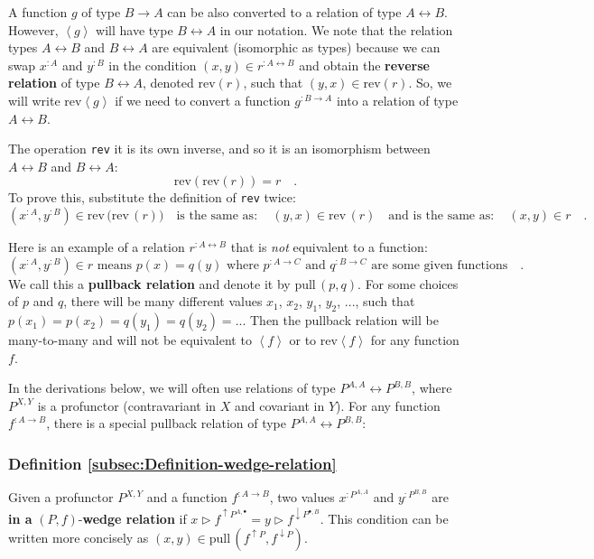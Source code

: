A function $g$ of type $B\rightarrow A$ can be also converted to
a relation of type $A\leftrightarrow B$. However, $\left<g\right>$
will have type $B\leftrightarrow A$ in our notation. We note that
the relation types $A\leftrightarrow B$ and $B\leftrightarrow A$
are equivalent (isomorphic as types) because we can swap $x^{:A}$
and $y^{:B}$ in the condition $(x,y)\in r^{:A\leftrightarrow B}$
and obtain the \textbf{reverse relation}
of type $B\leftrightarrow A$, denoted $\text{rev}\left(r\right)$,
such that $(y,x)\in\text{rev}\left(r\right)$. So, we will write $\text{rev}\left<g\right>$
if we need to convert a function $g^{:B\rightarrow A}$ into a relation
of type $A\leftrightarrow B$.

The operation \lstinline!rev! it is its own inverse, and so it is
an isomorphism between $A\leftrightarrow B$ and $B\leftrightarrow A$:
\[
\text{rev}\left(\text{rev}\left(r\right)\right)=r\quad.
\]
To prove this, substitute the definition of \lstinline!rev! twice:
\[
(x^{:A},y^{:B})\in\text{rev}\,\big(\text{rev}\,(r)\big)\quad\text{is the same as}:\quad(y,x)\in\text{rev}\,(r)\quad\text{and is the same as}:\quad(x,y)\in r\quad.
\]

Here is an example of a relation $r^{:A\leftrightarrow B}$ that is
\emph{not} equivalent to a function:
\[
(x^{:A},y^{:B})\in r\text{ means }p(x)=q(y)\text{ where }p^{:A\rightarrow C}\text{ and }q^{:B\rightarrow C}\text{ are some given functions}\quad.
\]
We call this a \textbf{pullback relation}
and denote it by $\text{pull}\,(p,q)$. For some choices of $p$ and
$q$, there will be many different values $x_{1}$, $x_{2}$, $y_{1}$,
$y_{2}$, ..., such that $p(x_{1})=p(x_{2})=q(y_{1})=q(y_{2})=...$
Then the pullback relation will be many-to-many and will not be equivalent
to $\left<f\right>$ or to $\text{rev}\left<f\right>$ for any function
$f$. 

In the derivations below, we will often use relations of type $P^{A,A}\leftrightarrow P^{B,B}$,
where $P^{X,Y}$ is a profunctor (contravariant in $X$ and covariant
in $Y$). For any function $f^{:A\rightarrow B}$, there is a special
pullback relation of type $P^{A,A}\leftrightarrow P^{B,B}$: 

\subsubsection{Definition \label{subsec:Definition-wedge-relation}\ref{subsec:Definition-wedge-relation}}

Given a profunctor
$P^{X,Y}$ and a function $f^{:A\rightarrow B}$, two values $x^{:P^{A,A}}$
and $y^{:P^{B,B}}$ are \textbf{in a} $\left(P,f\right)$-\textbf{wedge
relation} if $x\triangleright f^{\uparrow P^{A,\bullet}}=y\triangleright f^{\downarrow P^{\bullet,B}}$.
This condition can be written more concisely as $(x,y)\in\text{pull}\,(f^{\uparrow P},f^{\downarrow P})$.

